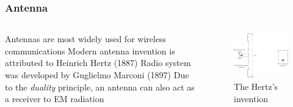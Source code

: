\documentclass[10pt, compress]{beamer}
\begin{document}
\begin{frame}
  \frametitle{Antenna}
  \begin{columns}[T] %
  \begin{column}{.4\textwidth}
\begin{outline}
  \1 Antennas are most widely used for wireless communications
  \1 Modern antenna invention is attributed to Heinrich Hertz (1887)
  \2 Radio system was developed by Guglielmo Marconi (1897)
  \1 Due to the \textit{duality} principle, an antenna can also act as a receiver to EM radiation
\end{outline}
   \end{column}
 \begin{column}[T]{.6\textwidth}
    \begin{figure}
      \centering
          \includegraphics[width=.9\textwidth]{antenna_hertz.pdf}
      \caption{The Hertz's invention}
    \end{figure}
      \end{column}%
\end{columns}
  \end{frame}
\end{document}
